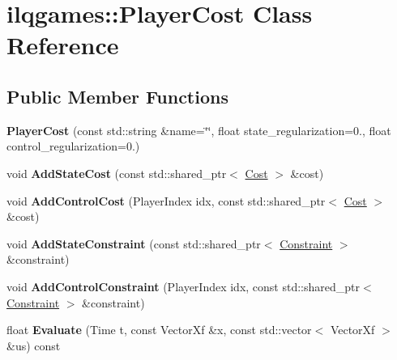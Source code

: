 \hypertarget{classilqgames_1_1_player_cost}{}\section{ilqgames\+:\+:Player\+Cost Class Reference}
\label{classilqgames_1_1_player_cost}
\subsection*{Public Member Functions}
\begin{DoxyCompactItemize}
\item 
{\bfseries Player\+Cost} (const std\+::string \&name=\char`\"{}\char`\"{}, float state\+\_\+regularization=0., float control\+\_\+regularization=0.)\hypertarget{classilqgames_1_1_player_cost_a271f96af8eeac9138b0832239ca62437}{}\label{classilqgames_1_1_player_cost_a271f96af8eeac9138b0832239ca62437}

\item 
void {\bfseries Add\+State\+Cost} (const std\+::shared\+\_\+ptr$<$ \hyperlink{classilqgames_1_1_cost}{Cost} $>$ \&cost)\hypertarget{classilqgames_1_1_player_cost_a3135d5f4c7722edc1ae385e0ecafcc87}{}\label{classilqgames_1_1_player_cost_a3135d5f4c7722edc1ae385e0ecafcc87}

\item 
void {\bfseries Add\+Control\+Cost} (Player\+Index idx, const std\+::shared\+\_\+ptr$<$ \hyperlink{classilqgames_1_1_cost}{Cost} $>$ \&cost)\hypertarget{classilqgames_1_1_player_cost_aba4df0e6414aba024c86bf77fe57f819}{}\label{classilqgames_1_1_player_cost_aba4df0e6414aba024c86bf77fe57f819}

\item 
void {\bfseries Add\+State\+Constraint} (const std\+::shared\+\_\+ptr$<$ \hyperlink{classilqgames_1_1_constraint}{Constraint} $>$ \&constraint)\hypertarget{classilqgames_1_1_player_cost_a9c1a21f669ab3f937c3be8a49bf7b5b3}{}\label{classilqgames_1_1_player_cost_a9c1a21f669ab3f937c3be8a49bf7b5b3}

\item 
void {\bfseries Add\+Control\+Constraint} (Player\+Index idx, const std\+::shared\+\_\+ptr$<$ \hyperlink{classilqgames_1_1_constraint}{Constraint} $>$ \&constraint)\hypertarget{classilqgames_1_1_player_cost_a9df6549112ab9b03bd639b4955b700da}{}\label{classilqgames_1_1_player_cost_a9df6549112ab9b03bd639b4955b700da}

\item 
float {\bfseries Evaluate} (Time t, const Vector\+Xf \&x, const std\+::vector$<$ Vector\+Xf $>$ \&us) const \hypertarget{classilqgames_1_1_player_cost_ac1ad99a1822d97a53d084fd9da162cb1}{}\label{classilqgames_1_1_player_cost_ac1ad99a1822d97a53d084fd9da162cb1}


\end{DoxyCompactItemize}
